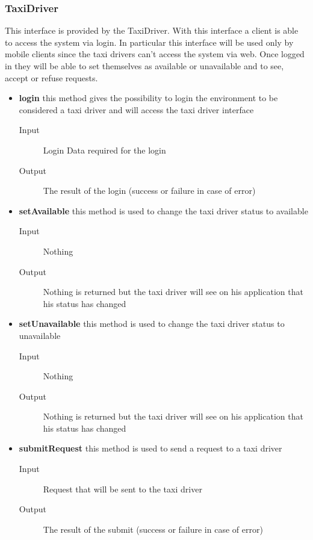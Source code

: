 		\subsubsection{TaxiDriver}
		This interface is provided by the TaxiDriver. With this interface a client is able to access the system via login. In particular this interface will be used only by mobile clients since the taxi drivers can't access the system via web. Once logged in they will be able to set themselves as available or unavailable and to see, accept or refuse requests.
		\begin{itemize}
			\item \textbf{login} this method gives the possibility to login the environment to be considered
			a taxi driver and will access the taxi driver interface
			\begin{description}
				\item[Input] Login Data required for the login
				\item[Output] The result of the login (success or failure in case of error)
			\end{description}
			\item \textbf{setAvailable} this method is used to change the taxi driver status to available
			\begin{description}
				\item[Input] Nothing
				\item[Output] Nothing is returned but the taxi driver will see on his application that his status has changed
			\end{description}
			\item \textbf{setUnavailable} this method is used to change the taxi driver status to unavailable
			\begin{description}
				\item[Input] Nothing
				\item[Output] Nothing is returned but the taxi driver will see on his application that his status has changed
			\end{description}
			\item \textbf{submitRequest} this method is used to send a request to a taxi driver
			\begin{description}
				\item[Input] Request that will be sent to the taxi driver
				\item[Output] The result of the submit (success or failure in case of error)
			\end{description}
		\end{itemize}
